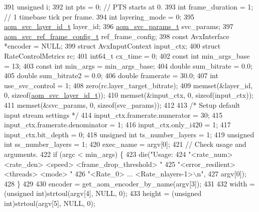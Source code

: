 \begin{DoxyCodeInclude}
{{{{{{{{{391   \textcolor{keywordtype}{unsigned} i;
392   \textcolor{keywordtype}{int} pts = 0;             \textcolor{comment}{// PTS starts at 0.}
393   \textcolor{keywordtype}{int} frame\_duration = 1;  \textcolor{comment}{// 1 timebase tick per frame.}
394   \textcolor{keywordtype}{int} layering\_mode = 0;
395   \hyperlink{structaom__svc__layer__id}{aom\_svc\_layer\_id\_t} layer\_id;
396   \hyperlink{structaom__svc__params}{aom\_svc\_params\_t} svc\_params;
397   \hyperlink{structaom__svc__ref__frame__config}{aom\_svc\_ref\_frame\_config\_t} ref\_frame\_config;
398   \textcolor{keyword}{const} AvxInterface *encoder = NULL;
399   \textcolor{keyword}{struct }AvxInputContext input\_ctx;
400   \textcolor{keyword}{struct }RateControlMetrics rc;
401   int64\_t cx\_time = 0;
402   \textcolor{keyword}{const} \textcolor{keywordtype}{int} min\_args\_base = 13;
403   \textcolor{keyword}{const} \textcolor{keywordtype}{int} min\_args = min\_args\_base;
404   \textcolor{keywordtype}{double} sum\_bitrate = 0.0;
405   \textcolor{keywordtype}{double} sum\_bitrate2 = 0.0;
406   \textcolor{keywordtype}{double} framerate = 30.0;
407   \textcolor{keywordtype}{int} use\_svc\_control = 1;
408   zero(rc.layer\_target\_bitrate);
409   memset(&layer\_id, 0, \textcolor{keyword}{sizeof}(\hyperlink{structaom__svc__layer__id}{aom\_svc\_layer\_id\_t}));
410   memset(&input\_ctx, 0, \textcolor{keyword}{sizeof}(input\_ctx));
411   memset(&svc\_params, 0, \textcolor{keyword}{sizeof}(svc\_params));
412 
413   \textcolor{comment}{/* Setup default input stream settings */}
414   input\_ctx.framerate.numerator = 30;
415   input\_ctx.framerate.denominator = 1;
416   input\_ctx.only\_i420 = 1;
417   input\_ctx.bit\_depth = 0;
418   \textcolor{keywordtype}{unsigned} \textcolor{keywordtype}{int} ts\_number\_layers = 1;
419   \textcolor{keywordtype}{unsigned} \textcolor{keywordtype}{int} ss\_number\_layers = 1;
420   exec\_name = argv[0];
421   \textcolor{comment}{// Check usage and arguments.}
422   \textcolor{keywordflow}{if} (argc < min\_args) \{
423     die(\textcolor{stringliteral}{"Usage: %
424         \textcolor{stringliteral}{"<rate\_num> <rate\_den> <speed> <frame\_drop\_threshold> "}
425         \textcolor{stringliteral}{"<error\_resilient> <threads> <mode> "}
426         \textcolor{stringliteral}{"<Rate\_0> ... <Rate\_nlayers-1>\(\backslash\)n"},
427         argv[0]);
428   \}
429 
430   encoder = get\_aom\_encoder\_by\_name(argv[3]);
431 
432   width = (\textcolor{keywordtype}{unsigned} int)strtoul(argv[4], NULL, 0);
433   height = (\textcolor{keywordtype}{unsigned} int)strtoul(argv[5], NULL, 0);
}}}}}}}}}}
\end{DoxyCodeInclude}

